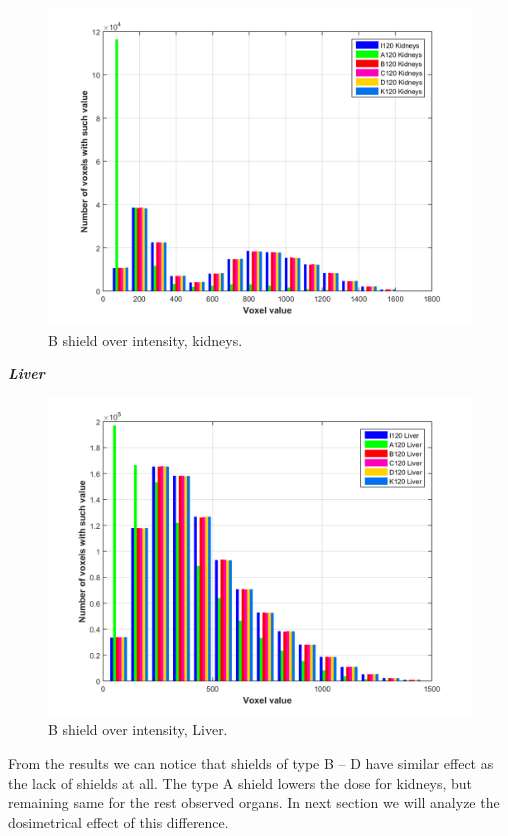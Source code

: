 \documentclass[fleqn,10pt]{SelfArx} %
\begin{document}
\begin{figure}[!htb]\centering
\includegraphics[width=\linewidth]{KidneysAllShields}
\caption{B shield over intensity, kidneys.}
\label{fig:KidneysAllShields}
\end{figure}


\textbf{\textit{Liver}}

\begin{figure}[!htb]\centering
\includegraphics[width=\linewidth]{LiverAllShields}
\caption{B shield over intensity, Liver.}
\label{fig:LiverAllShields}
\end{figure}


From the results we can notice that shields of type B -- D have similar effect as the lack of shields at all. The type A shield lowers the dose for kidneys, but remaining same for the rest observed organs. In next section we will analyze the dosimetrical effect of this difference.
\end{document}
